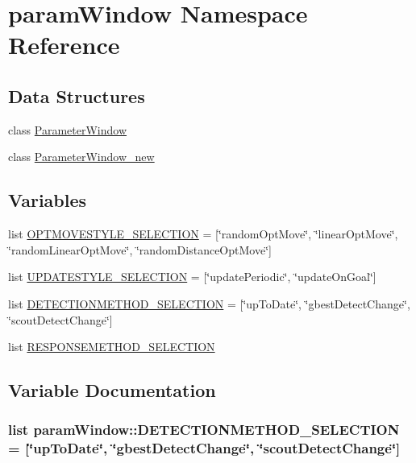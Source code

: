 \hypertarget{namespaceparamWindow}{
\section{paramWindow Namespace Reference}
\label{namespaceparamWindow}
}


\subsection*{Data Structures}
\begin{CompactItemize}
\item 
class \hyperlink{classparamWindow_1_1ParameterWindow}{ParameterWindow}
\item 
class \hyperlink{classparamWindow_1_1ParameterWindow__new}{ParameterWindow\_\-new}
\end{CompactItemize}
\subsection*{Variables}
\begin{CompactItemize}
\item 
list \hyperlink{namespaceparamWindow_56850046f0624b18a1494cdab5a0b820}{OPTMOVESTYLE\_\-SELECTION} = \mbox{[}\char`\"{}randomOptMove\char`\"{}, \char`\"{}linearOptMove\char`\"{}, \char`\"{}randomLinearOptMove\char`\"{}, \char`\"{}randomDistanceOptMove\char`\"{}\mbox{]}
\item 
list \hyperlink{namespaceparamWindow_15a6bcd5733ff142d21bce0c22bb80d5}{UPDATESTYLE\_\-SELECTION} = \mbox{[}\char`\"{}updatePeriodic\char`\"{}, \char`\"{}updateOnGoal\char`\"{}\mbox{]}
\item 
list \hyperlink{namespaceparamWindow_8bde0512d30cbdf1a03988bb025d1476}{DETECTIONMETHOD\_\-SELECTION} = \mbox{[}\char`\"{}upToDate\char`\"{}, \char`\"{}gbestDetectChange\char`\"{}, \char`\"{}scoutDetectChange\char`\"{}\mbox{]}
\item 
list \hyperlink{namespaceparamWindow_583e5cb2711c4ec24c84e23888b44c2c}{RESPONSEMETHOD\_\-SELECTION}
\end{CompactItemize}


\subsection{Variable Documentation}
\hypertarget{namespaceparamWindow_8bde0512d30cbdf1a03988bb025d1476}{
\subsubsection{\setlength{\rightskip}{0pt plus 5cm}list {\bf paramWindow::DETECTIONMETHOD\_\-SELECTION} = \mbox{[}\char`\"{}upToDate\char`\"{}, \char`\"{}gbestDetectChange\char`\"{}, \char`\"{}scoutDetectChange\char`\"{}\mbox{]}}}
\label{namespaceparamWindow_8bde0512d30cbdf1a03988bb025d1476}


